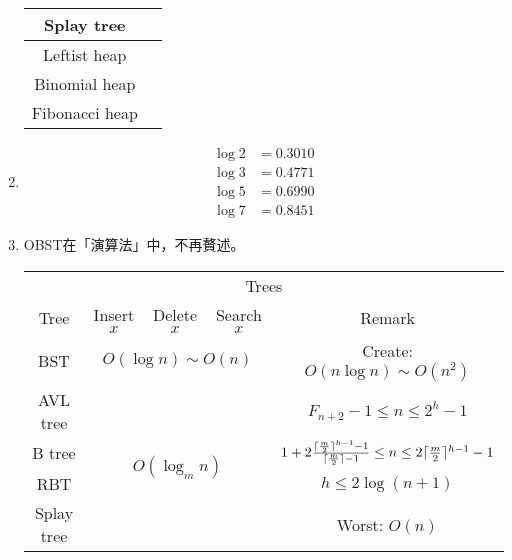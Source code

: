 \begin{enumerate}
\begin{table}[H]
\begin{tabular}{|c|c|}
            \hline
            Splay tree & \pageref{splaytree} \\
            \hline
            Leftist heap & \pageref{leftistheap} \\
            \hline
            Binomial heap & \pageref{binomialheap} \\
            \hline
            Fibonacci heap & \pageref{fibheap} \\
            \hline
        \end{tabular}
    \end{table}
    \item \begin{equation}
        \begin{aligned}
            \log 2 & = 0.3010 \\
            \log 3 & = 0.4771 \\
            \log 5 & = 0.6990 \\
            \log 7 & = 0.8451
        \end{aligned}
    \end{equation}
    \item OBST在「演算法」中，不再贅述。
    \begin{table}[H]
        \centering
        \begin{tabular}{|c|c|c|c|c|}
            \hline
            \multicolumn{5}{|c|}{Trees} \\
            \Xhline{3\arrayrulewidth}
            Tree & Insert $x$ & Delete $x$ & Search $x$ & Remark \\
            \Xhline{2\arrayrulewidth}
            BST & \multicolumn{3}{c|}{$O(\log n) \sim O(n)$} & Create: $O(n\log n) \sim O(n^2)$ \\
            \hline
            AVL tree & \multicolumn{3}{c|}{\multirow{4}{*}{$O(\log_m n)$}} & $F_{n + 2} - 1 \le n \le 2^h - 1$ \\
            \cline{1-1}\cline{5-5}
            B tree & \multicolumn{3}{c|}{} & $1 + 2\frac{\lceil\frac{m}{2}\rceil^{h - 1} - 1}{\lceil\frac{m}{2}\rceil - 1} \le n \le 2\lceil\frac{m}{2}\rceil^{h - 1} - 1$ \\
            \cline{1-1}\cline{5-5}
            RBT & \multicolumn{3}{c|}{} & $h \le 2\log (n + 1)$ \\
            \cline{1-1}\cline{5-5}
            Splay tree & \multicolumn{3}{c|}{} & Worst: $O(n)$ \\
            \hline
        \end{tabular}
    \end{table}

\end{enumerate}
